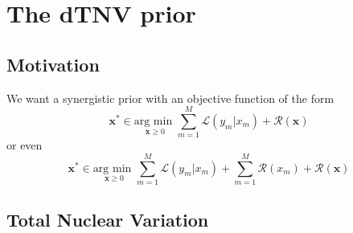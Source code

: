 \chapter{The dTNV prior}
\label{chapterlabel4}

\maketitle

\section{Motivation}

We want a synergistic prior with an objective function of the form
\[
    \mathcal{\mathbf{x}}^* \in \underset{\mathbf{x}\geq0}{\text{arg min }}\sum_{m=1}^M \mathcal{L}(y_m | x_m) + \mathcal{R(\mathbf{x})}
\]
or even
\[
    \mathcal{\mathbf{x}}^* \in \underset{\mathbf{x}\geq0}{\text{arg min }}\sum_{m=1}^M \mathcal{L}(y_m | x_m) +\sum_{m=1}^M \mathcal{R}(x_m) + \mathcal{R(\mathbf{x})}
\]

\section{Total Nuclear Variation}

